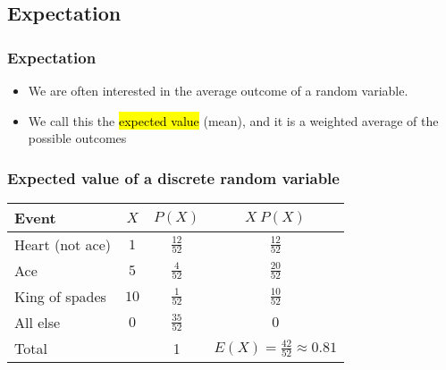 \documentclass[slidestop,compress,mathserif]{beamer}
\begin{document}
\subsection{Expectation}


\begin{frame}
\frametitle{Expectation}

\begin{itemize}

\item We are often interested in the average outcome of a random variable.

\item We call this the \hl{expected value} (mean), and it is a weighted average of the possible outcomes
\formula{\[\mu = E(X) = \sum_{i = 1}^k x_i ~ P(X = x_i)\]}

\end{itemize}

\end{frame}


\begin{frame}
\frametitle{Expected value of a discrete random variable}


\begin{center}
\renewcommand{\arraystretch}{1.5}
\begin{tabular}{l | c | c | c }
Event		& $X$ 		& $P(X)$        		& $X ~ P(X)$ \\
\hline
Heart (not ace)	& $1$		& $\frac{12}{52}$	& $\frac{12}{52}$ \\
Ace			& $5$		& $\frac{4}{52}$	& $\frac{20}{52}$ \\	
King of spades	& $10$		& $\frac{1}{52}$	& $\frac{10}{52}$ \\	
All else		& $0$		& $\frac{35}{52}$	& $0$ \\
\hline
Total			&			&		1		& $E(X) = \frac{42}{52} \approx 0.81$
\end{tabular}

\end{center}

\end{frame}
\end{document}
